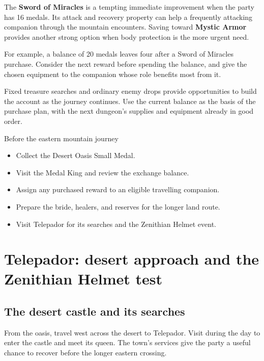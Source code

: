 
The \textbf{Sword of Miracles} is a tempting immediate improvement
when the party has 16 medals. Its attack and recovery property can
help a frequently attacking companion through the mountain encounters.
Saving toward \textbf{Mystic Armor} provides another strong option
when body protection is the more urgent need.

For example, a balance of 20 medals leaves four after a Sword of
Miracles purchase. Consider the next reward before spending the balance,
and give the chosen equipment to the companion whose role benefits
most from it.

Fixed treasure searches and ordinary enemy drops provide opportunities
to build the account as the journey continues. Use the current balance
as the basis of the purchase plan, with the next dungeon's supplies
and equipment already in good order.

\begin{routecheck}{Before the eastern mountain journey}
\begin{itemize}
  \item Collect the Desert Oasis Small Medal.
  \item Visit the Medal King and review the exchange balance.
  \item Assign any purchased reward to an eligible travelling companion.
  \item Prepare the bride, healers, and reserves for the longer land route.
  \item Visit Telepador for its searches and the Zenithian Helmet event.
\end{itemize}
\end{routecheck}

\section{Telepador: desert approach and the Zenithian Helmet test}

\subsection*{The desert castle and its searches}

From the oasis, travel west across the desert to Telepador. Visit
during the day to enter the castle and meet its queen. The town's
services give the party a useful chance to recover before the longer
eastern crossing.


